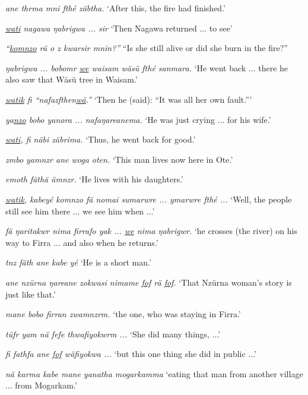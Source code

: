\begin{exe}
	\ex
	\begin{xlist}

	 \emph{ane thrma mni fthé zäbtha.}
	\trans `After this, the fire had finished.'

	 \emph{\uline{wati} nagawa ŋabrigwa ... sir}
	\trans `Then Nagawa returned ... to see'

	 \emph{``\uline{komnzo} rä o z kwarsir mnin?''}
	\trans ``Is she still alive or did she burn in the fire?''

	 \emph{ŋabrigwa ... bobomr \uline{we} waisam wäsü fthé sanmara.}
	\trans `He went back ... there he also saw that Wäsü tree in Waisam.'

	 \emph{\uline{watik} fi ``nafazfthen\uline{wä}.''}
	\trans `Then he (said): ``It was all her own fault.'''

	 \emph{ya\uline{nzo} bobo yanora ... nafaŋareanema.}
	\trans `He was just crying ... for his wife.'

	 \emph{\uline{wati}, fi näbi zäbrima.}
	\trans `Thus, he went back for good.'

	 \emph{zmbo yamnzr ane woga oten.}
	\trans `This man lives now here in Ote.'

	 \emph{emoth fäthä ämnzr.}
	\trans `He lives with his daughters.'

	 \emph{\uline{watik}, kabeyé komnzo fä nomai sumarwre ... ymarwre fthé ...}
	\trans `Well, the people still see him there ... we see him when ...'

	 \emph{fä ŋaritakwr nima firrafo yak ... \uline{we} nima ŋabrigwr.}
	\trans `he crosses (the river) on his way to Firra ... and also when he returns.'

	 \emph{tnz fäth ane kabe yé}
	\trans `He is a short man.'

	 \emph{ane nzürna ŋareane zokwasi nimame \uline{fof} rä \uline{fof}.}
	\trans `That Nzürna woman's story is just like that.'

	 \emph{mane bobo firran zwamnzrm.}
	\trans `the one, who was staying in Firra.'

	 \emph{tüfr yam nä fefe thwafiyokwrm ...}
	\trans `She did many things, ...'

	 \emph{fi fathfa ane \uline{fof} wäfiyokwa ...}
	\trans `but this one thing she did in public ...'

	 \emph{nä karma kabe mane yanatha mogarkamma}
	\trans `eating that man from another village ... from Mogarkam.'


\end{xlist}
\end{exe}
